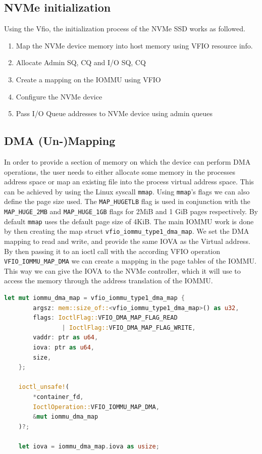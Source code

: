 \subsection{NVMe initialization}\label{sec:nvmeinit}
Using the Vfio, the initialization process of the NVMe SSD works as followed.

\begin{enumerate}
    \item Map the NVMe device memory into host memory using VFIO resource info.
    \item Allocate Admin SQ, CQ and I/O SQ, CQ
    \item Create a mapping on the IOMMU using VFIO
    \item Configure the NVMe device
    \item Pass I/O Queue addresses to NVMe device using admin queues
\end{enumerate}

\subsection{DMA (Un-)Mapping}\label{sec:dmamapping}
In order to provide a section of memory on which the device can perform DMA operations, the user needs to either allocate some memory in the processes address space or map an existing file into the process virtual address space. This can be achieved by using the Linux syscall \texttt{mmap}. Using \texttt{mmap}'s flags we can also define the page size used. The \texttt{MAP\_HUGETLB} flag is used in conjunction with the \texttt{MAP\_HUGE\_2MB} and \texttt{MAP\_HUGE\_1GB} flags for 2MiB and 1 GiB pages respectively. By default \texttt{mmap} uses the default page size of 4KiB.
The main IOMMU work is done by then creating the map struct \texttt{vfio\_iommu\_type1\_dma\_map}. We set the DMA mapping to read and write, and provide the same IOVA as the Virtual address. By then passing it to an ioctl call with the according VFIO operation \texttt{VFIO\_IOMMU\_MAP\_DMA} we can create a mapping in the page tables of the IOMMU. This way we can give the IOVA to the NVMe controller, which it will use to access the memory through the address translation of the IOMMU.

\begin{lstlisting}[language=Rust,caption={Mapping memory for DMA}, label=lst:mapdma]
    let mut iommu_dma_map = vfio_iommu_type1_dma_map {
        argsz: mem::size_of::<vfio_iommu_type1_dma_map>() as u32,
        flags: IoctlFlag::VFIO_DMA_MAP_FLAG_READ 
                | IoctlFlag::VFIO_DMA_MAP_FLAG_WRITE,
        vaddr: ptr as u64,
        iova: ptr as u64,
        size,
    };

    ioctl_unsafe!(
        *container_fd,
        IoctlOperation::VFIO_IOMMU_MAP_DMA,
        &mut iommu_dma_map
    )?;

    let iova = iommu_dma_map.iova as usize; 
\end{lstlisting}

